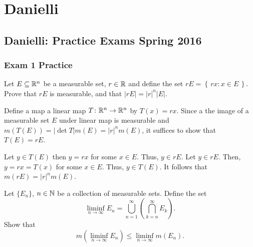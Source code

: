 \section{Danielli}
\subsection{Danielli: Practice Exams Spring 2016}
\setcounter{exercise}{0}
\setcounter{equation}{0}

\subsubsection{Exam 1 Practice}
\begin{problem}
  Let $E\subseteq\mathbb{R}^n$ be a measurable set, $r\in\mathbb{R}$ and define the set
  $rE=\left\{\,rx : x\in E\,\right\}$. Prove that $rE$ is measurable, and
  that $|rE|=|r|^n|E|$.
\end{problem}
\begin{solution}
  Define a map a linear map $T\colon\mathbb{R}^n\to\mathbb{R}^n$ by $T(x)=rx$. Since a
  the image of a measurable set $E$ under linear map is measurable and
  $m(T(E))=|{\det T}|m(E)=|r|^nm(E)$, it suffices to show that $T(E)=rE$.

  Let $y\in T(E)$ then $y=rx$ for some $x\in E$. Thus, $y\in rE$. Let $y\in
  rE$. Then, $y=rx=T(x)$ for some $x\in E$. Thus, $y\in T(E)$. It follows
  that $m(rE)=|r|^nm(E)$.
\end{solution}

\begin{problem}
  Let $\{E_n\}$, $n\in\mathbb{N}$ be a collection of measurable sets. Define the
  set
  \[
    \liminf_{n\to\infty} E_n
    =\bigcup_{n=1}^\infty\left(\bigcap_{k=n}^\infty E_k\right).
  \]
  Show that
  \[
    m\left(\liminf_{n\to\infty}
      E_n\right)\leq\liminf_{n\to\infty}m(E_n).
  \]
\end{problem}

